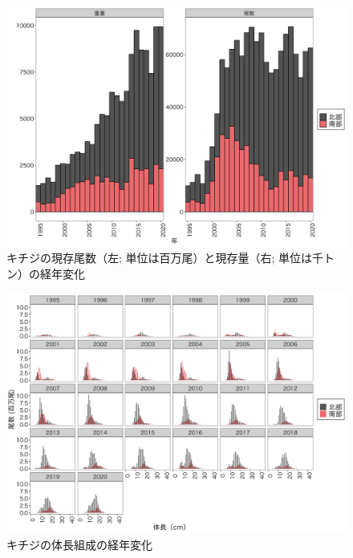 \documentclass[11pt]{article} %
\begin{document}
\begin{linenumbers}
\begin{figure}[h]
  \centering
  \includegraphics[width = 14cm]{キチジtrend.png}
  \caption{キチジの現存尾数（左; 単位は百万尾）と現存量（右; 単位は千トン）の経年変化}
\end{figure}

\begin{figure}[h]
  \centering
  \includegraphics[width = 14cm]{キチジlength.png}
  \caption{キチジの体長組成の経年変化}
\end{figure}


\end{linenumbers}
\end{document}
